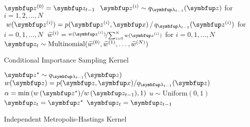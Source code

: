 \begin{center}
\begin{minipage}[c]{0.7\textwidth}%
  \begin{algorithm2e}[H]
    \DontPrintSemicolon
    \SetAlgoLined
    \(\vz^{(0)} = \vz_{t-1}\) \;
    \(\;\vz^{(i)} \sim q_{\vlambda_{t-1}}(\vz)\) for \(i = 1, 2,\ldots, N\) \;
    \(\;w(\vz^{(i)}) = p(\vz^{(i)},\vx) \,/\, q_{\vlambda_{t-1}}(\vz^{(i)}) \) for \(i = 0, 1,\ldots, N\)\;
    \(\;\widetilde{w}^{(i)} = \nicefrac{w(\vz^{(i)})}{ \sum^{N}_{i=0} w(\vz^{(i)}) }\) for \(i = 0, 1,\ldots, N\)\;
    \(\vz_{t} \sim \mathrm{Multinomial}(\widetilde{w}^{(0)}, \widetilde{w}^{(1)}, \ldots, \widetilde{w}^{(N)}) \)\;
    \caption{Conditional Importance Sampling Kernel}\label{alg:cis}
  \end{algorithm2e}
\end{minipage}

\begin{minipage}[c]{0.7\textwidth}%
  \begin{algorithm2e}[H]
    \DontPrintSemicolon
    \SetAlgoLined
    \(\vz^* \sim q_{\vlambda_{t-1}}(\vz)\)\;
    \(w(\vz) = p(\vz,\vx)/q_{\vlambda_{t-1}}(\vz) \)\;
    \(\alpha = \min\left( w\,(\vz^*)/w\,(\vz_{t-1}), 1\right)\)\;
    \(u \sim \mathrm{Uniform}(0, 1) \)\;
        {
          \(\vz_t = \vz^*\)
        }
        {
          \(\vz_t = \vz_{t-1}\)
        }
        \caption{Independent Metropolis-Hastings Kernel}\label{alg:imh}
  \end{algorithm2e}
\end{minipage}

\end{center}

